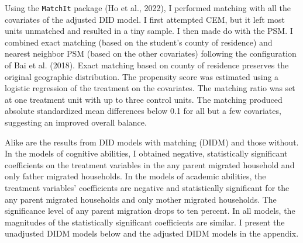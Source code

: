 \documentclass[
  man,floatsintext]{apa7}
\begin{document}
Using the \texttt{MatchIt} package (Ho et al., 2022), I performed matching with all the covariates of the adjusted DID model. I first attempted CEM, but it left most units unmatched and resulted in a tiny sample. I then made do with the PSM. I combined exact matching (based on the student's county of residence) and nearest neighbor PSM (based on the other covariates) following the configuration of Bai et al. (2018). Exact matching based on county of residence preserves the original geographic distribution. The propensity score was estimated using a logistic regression of the treatment on the covariates. The matching ratio was set at one treatment unit with up to three control units. The matching produced absolute standardized mean differences below 0.1 for all but a few covariates, suggesting an improved overall balance.

Alike are the results from DID models with matching (DIDM) and those without. In the models of cognitive abilities, I obtained negative, statistically significant coefficients on the treatment variables in the any parent migrated household and only father migrated households. In the models of academic abilities, the treatment variables' coefficients are negative and statistically significant for the any parent migrated households and only mother migrated households. The significance level of any parent migration drops to ten percent. In all models, the magnitudes of the statistically significant coefficients are similar. I present the unadjusted DIDM models below and the adjusted DIDM models in the appendix.
\end{document}
